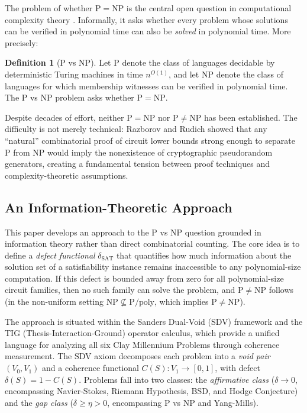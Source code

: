 \documentclass[11pt]{article}
\theoremstyle{definition}
\newtheorem{definition}[theorem]{Definition}
\theoremstyle{remark}
\newcommand{\Ppoly}{\mathrm{P/poly}}
\newcommand{\dSAT}{\delta_{\mathrm{SAT}}}
\begin{document}
The problem of whether $\mathrm{P} = \mathrm{NP}$ is the central open question
in computational complexity theory \cite{Cook71, Levin73}.  Informally, it asks
whether every problem whose solutions can be verified in polynomial time can
also be \emph{solved} in polynomial time.  More precisely:

\begin{definition}[P vs NP]
\label{def:pvsnp}
Let $\mathrm{P}$ denote the class of languages decidable by deterministic
Turing machines in time $n^{O(1)}$, and let $\mathrm{NP}$ denote the class of
languages for which membership witnesses can be verified in polynomial time.
The P vs NP problem asks whether $\mathrm{P} = \mathrm{NP}$.
\end{definition}

Despite decades of effort, neither $\mathrm{P} = \mathrm{NP}$ nor
$\mathrm{P} \neq \mathrm{NP}$ has been established.  The difficulty
is not merely technical: Razborov and Rudich \cite{RR} showed that any
``natural'' combinatorial proof of circuit lower bounds strong enough to
separate $\mathrm{P}$ from $\mathrm{NP}$ would imply the nonexistence
of cryptographic pseudorandom generators, creating a fundamental tension
between proof techniques and complexity-theoretic assumptions.

\subsection{An Information-Theoretic Approach}

This paper develops an approach to the P vs NP question grounded in
information theory rather than direct combinatorial counting.  The
core idea is to define a \emph{defect functional} $\dSAT$ that quantifies
how much information about the solution set of a satisfiability instance
remains inaccessible to any polynomial-size computation.  If this defect
is bounded away from zero for all polynomial-size circuit families, then
no such family can solve the problem, and $\mathrm{P} \neq \mathrm{NP}$
follows (in the non-uniform setting $\mathrm{NP} \not\subseteq \Ppoly$,
which implies $\mathrm{P} \neq \mathrm{NP}$).

The approach is situated within the Sanders Dual-Void (SDV) framework
and the TIG (Thesis-Interaction-Ground) operator calculus, which provide
a unified language for analyzing all six Clay Millennium Problems through
coherence measurement.  The SDV axiom decomposes each problem into a
\emph{void pair} $(V_0, V_1)$ and a coherence functional $C(S): V_1 \to [0,1]$,
with defect $\delta(S) = 1 - C(S)$.  Problems fall into two classes:
the \emph{affirmative class} ($\delta \to 0$, encompassing Navier-Stokes,
Riemann Hypothesis, BSD, and Hodge Conjecture) and the \emph{gap class}
($\delta \geq \eta > 0$, encompassing P vs NP and Yang-Mills).
\end{document}

